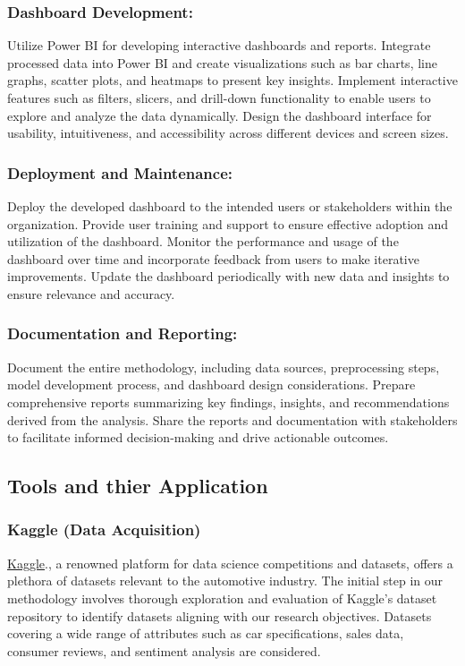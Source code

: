 \documentclass{article}
\begin{document}
{\subsubsection{Dashboard Development:}

Utilize Power BI for developing interactive dashboards and reports.
Integrate processed data into Power BI and create visualizations such as bar charts, line graphs, scatter plots, and heatmaps to present key insights.
Implement interactive features such as filters, slicers, and drill-down functionality to enable users to explore and analyze the data dynamically.
Design the dashboard interface for usability, intuitiveness, and accessibility across different devices and screen sizes.
\subsubsection{Deployment and Maintenance:}

Deploy the developed dashboard to the intended users or stakeholders within the organization.
Provide user training and support to ensure effective adoption and utilization of the dashboard.
Monitor the performance and usage of the dashboard over time and incorporate feedback from users to make iterative improvements.
Update the dashboard periodically with new data and insights to ensure relevance and accuracy.
\subsubsection{Documentation and Reporting:}

Document the entire methodology, including data sources, preprocessing steps, model development process, and dashboard design considerations.
Prepare comprehensive reports summarizing key findings, insights, and recommendations derived from the analysis.
Share the reports and documentation with stakeholders to facilitate informed decision-making and drive actionable outcomes.


\subsection{Tools and thier Application}

\subsubsection{ Kaggle (Data Acquisition)}

\href{https://www.kaggle.com/}{Kaggle}., a renowned platform for data science competitions and datasets, offers a plethora of datasets relevant to the automotive industry. The initial step in our methodology involves thorough exploration and evaluation of Kaggle's dataset repository to identify datasets aligning with our research objectives. Datasets covering a wide range of attributes such as car specifications, sales data, consumer reviews, and sentiment analysis are considered.

}
\end{document}
